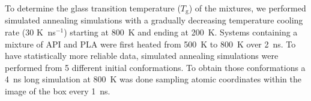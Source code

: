 To determine the glass transition temperature ($T_\mathrm{g}$) of the mixtures, we performed simulated annealing simulations with a gradually decreasing temperature cooling rate (30 K$\ $ ns$^{-1}$) starting at 800~K and ending at 200~K. Systems containing a mixture of API and PLA were first heated from 500~K to 800~K over 2~ns. To have statistically more reliable data, simulated annealing simulations were performed from 5 different initial conformations. To obtain those conformations a 4~ns long simulation at 800~K was done sampling atomic coordinates within the image of the box every 1~ns.  